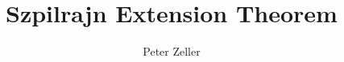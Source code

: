 \documentclass[11pt,a4paper]{article}
\begin{document}
\title{Szpilrajn Extension Theorem}
\author{Peter Zeller}
\maketitle






\end{document}
